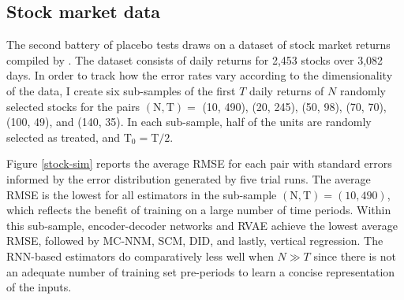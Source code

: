 \documentclass[hidelinks,12pt]{article}
\begin{document}
\subsection{Stock market data}

The second battery of placebo tests draws on a dataset of stock market returns compiled by \citet{athey2017matrix}. The dataset consists of daily returns for 2,453 stocks over 3,082 days. In order to track how the error rates vary according to the dimensionality of the data, I create six sub-samples of the first $T$ daily returns of $N$ randomly selected stocks for the pairs $(\text{N}, \text{T}) = $ (10, 490), (20, 245), (50, 98), (70, 70), (100, 49), and (140, 35). In each sub-sample, half of the units are randomly selected as treated, and $\text{T}_0 = \text{T}/2$.

Figure \ref{stock-sim} reports the average RMSE for each pair with standard errors informed by the error distribution generated by five trial runs. The average RMSE is the lowest for all estimators in the sub-sample $(\text{N}, \text{T}) = (10, 490)$, which reflects the benefit of training on a large number of time periods. Within this sub-sample, encoder-decoder networks and RVAE achieve the lowest average RMSE, followed by MC-NNM, SCM, DID, and lastly, vertical regression. The RNN-based estimators do comparatively less well when $N \gg T$ since there is not an adequate number of training set pre-periods to learn a concise representation of the inputs. 
\end{document}
